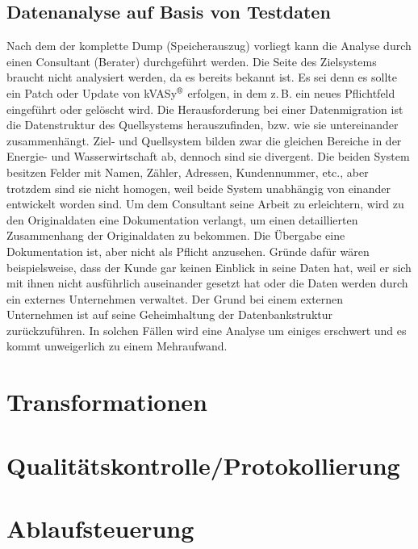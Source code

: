 \subsection*{Datenanalyse auf Basis von Testdaten}
Nach dem der komplette Dump (Speicherauszug) vorliegt kann die Analyse durch einen Consultant (Berater) durchgeführt werden. Die Seite des Zielsystems braucht nicht analysiert werden, da es bereits bekannt ist. Es sei denn es sollte ein Patch oder Update von kVASy$^\text{\textregistered}$ erfolgen, in dem z.\,B. ein neues Pflichtfeld eingeführt oder gelöscht wird. Die Herausforderung bei einer Datenmigration ist die Datenstruktur des Quellsystems herauszufinden, bzw. wie sie untereinander zusammenhängt. Ziel- und Quellsystem bilden zwar die gleichen Bereiche in der Energie- und Wasserwirtschaft ab, dennoch sind sie divergent. Die beiden System besitzen Felder mit Namen, Zähler, Adressen, Kundennummer, etc., aber trotzdem sind sie nicht homogen, weil beide System unabhängig von einander entwickelt worden sind. Um dem Consultant seine Arbeit zu erleichtern, wird zu den Originaldaten eine Dokumentation verlangt, um einen detaillierten Zusammenhang der Originaldaten zu bekommen. Die Übergabe eine Dokumentation ist, aber nicht als Pflicht anzusehen. Gründe dafür wären beispielsweise, dass der Kunde gar keinen Einblick in seine Daten hat, weil er sich mit ihnen nicht ausführlich auseinander gesetzt hat oder die Daten werden durch ein externes Unternehmen verwaltet. Der Grund bei einem externen Unternehmen ist auf seine Geheimhaltung der Datenbankstruktur zurückzuführen. In solchen Fällen wird eine Analyse um einiges erschwert und es kommt unweigerlich zu einem Mehraufwand.

\section{Transformationen}
\section{Qualitätskontrolle/Protokollierung}
\section{Ablaufsteuerung}
